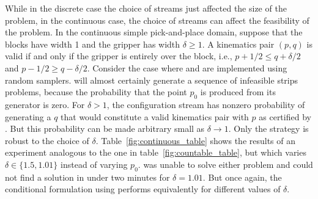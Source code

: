 \documentclass[letterpaper]{article} %
\theoremstyle{plain}\newtheorem{thm}{Theorem}
\theoremstyle{definition}\newtheorem{defn}{Definition}
\theoremstyle{plain}\newtheorem{lem}{Lemma}
\theoremstyle{plain}\newtheorem{cor}{Corollary}
\newcommand{\strips}{{\sc strips}}
\begin{document}
While in the discrete case the choice of streams just affected the
size of the problem, in the continuous case, the choice of streams can
affect the feasibility of the problem. 
In the continuous simple pick-and-place domain, suppose that the blocks have width 1 and the
gripper has width $\delta \geq 1$.  A kinematics pair $(p,q)$ is valid
if and only if the gripper is entirely over the block, i.e.,
$p + 1/2 \leq q + \delta/2$ and $p - 1/2 \geq q -\delta/2$.  Consider
the case where  and  are implemented using
random samplers.   will almost certainly generate a
sequence of infeasible \strips{} problems, because the probability
that the point $p_0$ is produced from its generator is zero.  For
$\delta > 1$, the configuration stream has nonzero probability of
generating a $q$ that would constitute a valid kinematics pair with
$p$ as certified by . But this probability can be made
arbitrary small as $\delta \to 1$. Only the  strategy
is robust to the choice of $\delta$. Table~\ref{fig:continuous_table}
shows the results of an experiment analogous to the one in
table~\ref{fig:countable_table}, but which varies
$\delta \in \{1.5, 1.01\}$ instead of varying $p_0$.  was unable
to solve either problem and  could not find a solution in
under two minutes for $\delta = 1.01$. But once again, the conditional
formulation using  performs equivalently for different
values of $\delta$.
\end{document}
